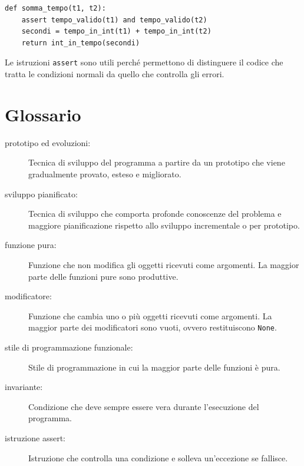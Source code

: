 \documentclass[10pt]{book}
\begin{document}
\begin{verbatim}
def somma_tempo(t1, t2):
    assert tempo_valido(t1) and tempo_valido(t2)
    secondi = tempo_in_int(t1) + tempo_in_int(t2)
    return int_in_tempo(secondi)
\end{verbatim}
%
Le istruzioni {\tt assert} sono utili perché permettono di distinguere il codice che tratta le condizioni normali da quello che controlla gli errori.


\section{Glossario}

\begin{description}

\item[prototipo ed evoluzioni:] Tecnica di sviluppo del programma a partire da un prototipo che viene gradualmente provato, esteso e migliorato.

\item[sviluppo pianificato:] Tecnica di sviluppo che comporta profonde conoscenze del problema e maggiore pianificazione rispetto allo sviluppo incrementale o per prototipo.

\item[funzione pura:] Funzione che non modifica gli oggetti ricevuti come argomenti. La maggior parte delle funzioni pure sono produttive.

\item[modificatore:] Funzione che cambia uno o più oggetti ricevuti come argomenti. La maggior parte dei modificatori sono vuoti, ovvero restituiscono {\tt None}.

\item[stile di programmazione funzionale:] Stile di programmazione in cui la maggior parte delle funzioni è pura.

\item[invariante:] Condizione che deve sempre essere vera durante l'esecuzione del programma.

\item[istruzione assert:] Istruzione che controlla una condizione e solleva un'eccezione se fallisce.

\end{description}
\end{document}
